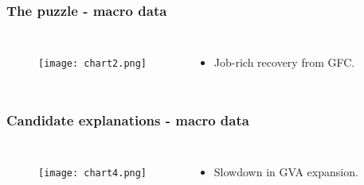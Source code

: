\documentclass{beamer}
\begin{document}
\begin{frame}
\frametitle{The puzzle - macro data}

\begin{columns}


\begin{figure}
\centering
\texttt{[image: chart2.png]}
\end{figure}


\begin{itemize}
\item Job-rich recovery from GFC.


\end{itemize}
\end{columns}
\end{frame}




\begin{frame}
\frametitle{Candidate explanations - macro data}

\begin{columns}


\begin{figure}
\centering
\texttt{[image: chart4.png]}
\end{figure}


\begin{itemize}
\item Slowdown in GVA expansion.


\end{itemize}
\end{columns}
\end{frame}
\end{document}
